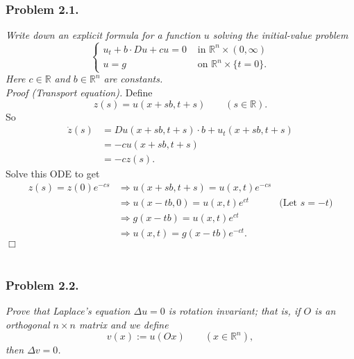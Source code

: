 \documentclass{article}
\begin{document}



\subsubsection*{Problem 2.1.}
\emph{Write down an explicit formula for a function $u$ solving
the initial-value problem
\begin{equation*}
  \begin{cases}
    u_t + b \cdot Du + cu = 0 & \text{ in } \mathbb{R}^n \times (0,\infty) \\
    u                     = g & \text{ on } \mathbb{R}^n \times \{ t=0 \}.
  \end{cases}
\end{equation*}
Here $c \in \mathbb{R}$ and $b \in \mathbb{R}^n$ are constants.} \\

\emph{Proof (Transport equation).}
Define
\[
  z(s) = u(x+sb,t+s) \qquad (s \in \mathbb{R}).
\]
So
\begin{align*}
  \dot{z}(s)
  &= Du(x+sb,t+s) \cdot b + u_t(x+sb,t+s) \\
  &= -cu(x+sb,t+s) \\
  &= -cz(s).
\end{align*}
Solve this ODE to get
\begin{align*}
  z(s) = z(0) e^{-cs}
  &\Longrightarrow
  u(x+sb,t+s) = u(x,t) e^{-cs} \\
  &\Longrightarrow
  u(x-tb,0) = u(x,t) e^{ct}
    &\text{(Let $s = -t$)} \\
  &\Longrightarrow
  g(x-tb) = u(x,t) e^{ct} \\
  &\Longrightarrow
  u(x,t) = g(x-tb) e^{-ct}.
\end{align*}
$\Box$ \\\\






\subsubsection*{Problem 2.2.}
\emph{Prove that Laplace's equation $\Delta u = 0$ is rotation invariant;
that is, if $O$ is an orthogonal $n \times n$ matrix and we define
\[
  v(x) := u(Ox) \qquad (x \in \mathbb{R}^n),
\]
then $\Delta v = 0$.} \\
\end{document}
